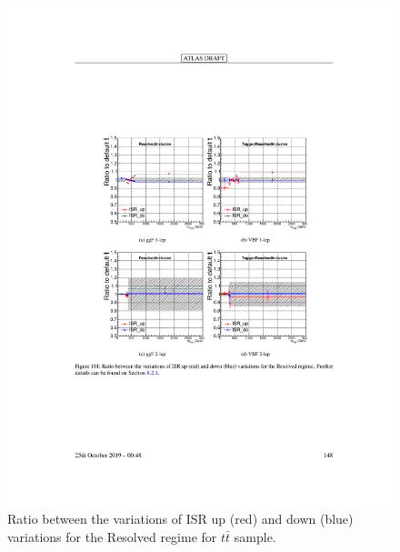 \begin{figure}[h!]
  \centering
  \includegraphics[width=\hsize]{figures/Analysis/modelingsysts/ttbar_isr_res.pdf}
            \caption{Ratio between the variations of ISR up (red) and down (blue) variations for the Resolved regime for $t\bar{t}$ sample.} 
  \label{fig:ttbar_isr_res}
\end{figure} 
\FloatBarrier


